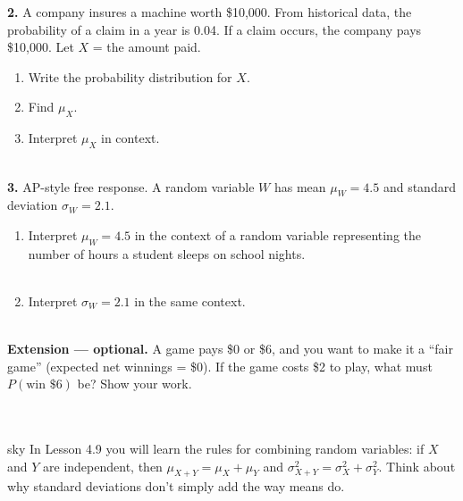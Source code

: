 \documentclass[10pt]{article}
\begin{document}
\begin{practicebox}
\vspace{0.14in}

\textbf{2.} A company insures a machine worth \$10{,}000. From historical data, the
probability of a claim in a year is 0.04. If a claim occurs, the company pays \$10{,}000.
Let $X$ = the amount paid.
\begin{enumerate}[label=(\alph*), leftmargin=2em, itemsep=8pt]
  \item Write the probability distribution for $X$.

        \vspace{0.3in}

  \item Find $\mu_X$. \quad \blank{4cm}
  \item Interpret $\mu_X$ in context.\\
        \writeline\\[1pt]\writeline
\end{enumerate}

\vspace{0.14in}

\textbf{3.} AP-style free response. A random variable $W$ has mean $\mu_W = 4.5$ and
standard deviation $\sigma_W = 2.1$.
\begin{enumerate}[label=(\alph*), leftmargin=2em, itemsep=8pt]
  \item Interpret $\mu_W = 4.5$ in the context of a random variable representing the
        number of hours a student sleeps on school nights.\\
        \writeline\\[1pt]\writeline

  \item Interpret $\sigma_W = 2.1$ in the same context.\\
        \writeline\\[1pt]\writeline
\end{enumerate}

\end{practicebox}

\vspace{0.1in}

\begin{extensionbox}
\small
\textbf{Extension --- optional.}
A game pays \$0 or \$6, and you want to make it a ``fair game'' (expected net winnings = \$0).
If the game costs \$2 to play, what must $P(\text{win \$6})$ be?
Show your work.\\[4pt]
\writeline\\[1pt]\writeline\\[1pt]\writeline
\end{extensionbox}

\vspace{0.1in}

\begin{blurbbox}{sky}
\small
In Lesson 4.9 you will learn the rules for combining random variables: if $X$ and $Y$ are
independent, then $\mu_{X+Y} = \mu_X + \mu_Y$ and $\sigma^2_{X+Y} = \sigma^2_X + \sigma^2_Y$.
Think about why standard deviations don't simply add the way means do.
\end{blurbbox}
\end{document}
